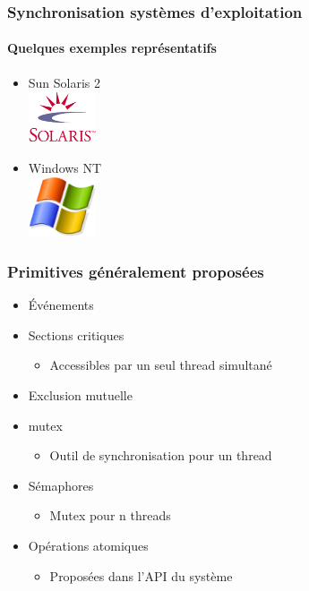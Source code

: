 \begin{frame}
\frametitle{Synchronisation systèmes d’exploitation}
\framesubtitle{Quelques exemples représentatifs}

\begin{itemize}
\item Sun Solaris 2\\

\includegraphics[width=2cm]{../illustration/Logo_Solaris.png}
\item Windows NT\\

\includegraphics[width=2cm]{../illustration/logo_windows.png}
\end{itemize}
\end{frame}

\begin{frame}
\frametitle{Primitives généralement proposées}
\begin{itemize}
\item Événements
\item Sections critiques
\begin{itemize}
\item Accessibles par un seul thread simultané
\end{itemize}
\item Exclusion mutuelle
\item mutex
\begin{itemize}
\item Outil de synchronisation pour un thread
\end{itemize}
\item Sémaphores
\begin{itemize}
\item Mutex pour n threads
\end{itemize}
\item Opérations atomiques
\begin{itemize}
\item Proposées dans l'API du système
\end{itemize}
\end{itemize}
\end{frame}

